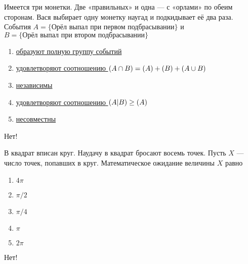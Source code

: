 \documentclass[t]{beamer}
\let\P\relax
\DeclareMathOperator{\P}{\mathbb{P}}
\begin{document}
 \begin{frame} \label{7-No} 
\begin{block}{7} 

Имеется три монетки. Две «правильных» и одна — с «орлами» по обеим сторонам. Вася выбирает одну монетку наугад и подкидывает её два раза. События $A = \{ \text{Орёл выпал при первом подбрасывании} \}$ и $B =\{\text{Орёл выпал при втором подбрасывании}\}$
   


 \end{block} 
\begin{enumerate} 
\item[] \hyperlink{7-No}{\beamergotobutton{} образуют полную группу событий}
\item[] \hyperlink{7-No}{\beamergotobutton{} удовлетворяют соотношению $\P(A\cap B)=\P(A)+\P(B) + \P(A\cup B)$
}
\item[] \hyperlink{7-No}{\beamergotobutton{} независимы}
\item[] \hyperlink{7-Yes}{\beamergotobutton{} удовлетворяют соотношению $\P(A|B)\geq \P(A)$}
\item[] \hyperlink{7-No}{\beamergotobutton{} несовместны}
\end{enumerate} 

 \alert{Нет!} 
\end{frame} 


 \begin{frame} \label{8-No} 
\begin{block}{8} 

В квадрат вписан круг. Наудачу в квадрат бросают восемь точек. Пусть $X$ — число точек, попавших в круг. Математическое ожидание величины $X$ равно
     


 \end{block} 
\begin{enumerate} 
\item[] \hyperlink{8-No}{\beamergotobutton{} $4 \pi$
}
\item[] \hyperlink{8-No}{\beamergotobutton{} $\pi / 2$}
\item[] \hyperlink{8-No}{\beamergotobutton{} $\pi / 4$}
\item[] \hyperlink{8-No}{\beamergotobutton{} $\pi$}
\item[] \hyperlink{8-Yes}{\beamergotobutton{} $2\pi$}
\end{enumerate} 

 \alert{Нет!} 
\end{frame} 
\end{document}
